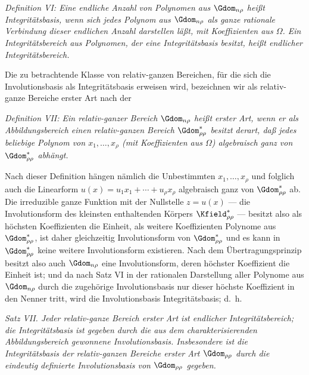 \documentclass[11pt]{article}
\begin{document}
\emph{Definition VI: Eine endliche Anzahl von Polynomen aus $\Gdom_{n\rho}$ heißt Integritätsbasis, wenn sich jedes Polynom aus $\Gdom_{n\rho}$ als ganze rationale Verbindung dieser endlichen Anzahl darstellen läßt, mit Koeffizienten aus $\Omega$. Ein Integritätsbereich aus Polynomen, der eine Integritätsbasis besitzt, heißt endlicher Integritätsbereich.}

Die zu betrachtende Klasse von relativ-ganzen Bereichen, für die sich die Involutionsbasis als Integritätsbasis erweisen wird, bezeichnen wir als relativ-ganze Bereiche erster Art nach der

\emph{Definition VII: Ein relativ-ganzer Bereich $\Gdom_{n\rho}$ heißt erster Art, wenn er als Abbildungsbereich einen relativ-ganzen Bereich $\Gdom^*_{\rho\rho}$ besitzt derart, daß jedes beliebige Polynom von $x_1,
\ldots,x_\rho$ (mit Koeffizienten aus $\Omega$) algebraisch ganz von $\Gdom^*_{\rho\rho}$ abhängt.}

Nach dieser Definition hängen nämlich die Unbestimmten $x_1,
\ldots,x_\rho$ und folglich auch die Linearform $u(x)=u_1x_1+\cdots+u_\rho x_\rho$ algebraisch ganz von $\Gdom^*_{\rho\rho}$ ab. Die irreduzible ganze Funktion mit der Nullstelle $z=u(x)$ --- die Involutionsform des kleinsten enthaltenden Körpers $\Kfield^*_{\rho\rho}$ --- besitzt also als höchsten Koeffizienten die Einheit, als weitere Koeffizienten Polynome aus $\Gdom^*_{\rho\rho}$, ist daher gleichzeitig Involutionsform von $\Gdom^*_{\rho\rho}$ und es kann in $\Gdom^*_{\rho\rho}$ keine weitere Involutionsform existieren. Nach dem Übertragungsprinzip besitzt also auch $\Gdom_{n\rho}$ eine Involutionsform, deren höchster Koeffizient die Einheit ist; und da nach Satz VI in der rationalen Darstellung aller Polynome aus $\Gdom_{n\rho}$ durch die zugehörige Involutionsbasis nur dieser höchste Koeffizient in den Nenner tritt, wird die Involutionsbasis Integritätsbasis; d.~h.

\emph{Satz VII. Jeder relativ-ganze Bereich erster Art ist endlicher Integritätsbereich; die Integritätsbasis ist gegeben durch die aus dem charakterisierenden Abbildungsbereich gewonnene Involutionsbasis. Insbesondere ist die Integritätsbasis der relativ-ganzen Bereiche erster Art $\Gdom_{\rho\rho}$ durch die eindeutig definierte Involutionsbasis von $\Gdom_{\rho\rho}$ gegeben.}
\end{document}
